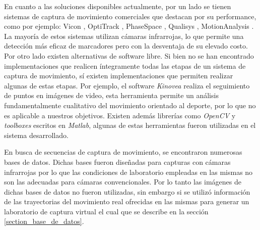 \hspace*{0.5cm}En cuanto a las soluciones disponibles actualmente, por un lado se tienen sistemas de captura de movimiento comerciales que destacan por su performance, como por ejemplo: Vicon \cite{vicon},
OptiTrack \cite{optitrack}, PhaseSpace \cite{phasespace}, Qualisys \cite{qualisys}, MotionAnalysis \cite{motion_analysis}. La mayoría de estos sistemas utilizan cámaras infrarrojas, lo que permite una detección más eficaz de marcadores pero con la desventaja de su elevado costo. Por otro lado existen  alternativas de software libre. Si bien no se han encontrado implementaciones que realicen íntegramente todas las etapas de un sistema de captura de movimiento, sí existen implementaciones que permiten realizar algunas de estas etapas. Por ejemplo, el software \emph{Kinovea} \cite{kinovea} realiza el seguimiento de puntos en imágenes de video, esta herramienta permite un análisis fundamentalmente cualitativo del movimiento orientado al deporte, por lo que no es aplicable a nuestros objetivos. Existen además librerías como \textit{OpenCV} y \textit{toolboxes} escritos en \emph{Matlab}, algunas de estas herramientas fueron utilizadas en el sistema desarrollado. 




\hspace*{0.5cm}En busca de secuencias de captura de movimiento, se encontraron numerosas bases de datos. Dichas bases fueron diseñadas para capturas con cámaras infrarrojas por lo que las condiciones de laboratorio empleadas en las mismas no son las adecuadas para cámaras convencionales. Por lo tanto las imágenes de dichas bases de datos no fueron utilizadas, sin embargo si se utilizó información de las trayectorias del movimiento real ofrecidas en las mismas para generar un laboratorio de captura virtual el cual que se describe en  la sección \ref{section_base_de_datos}.

